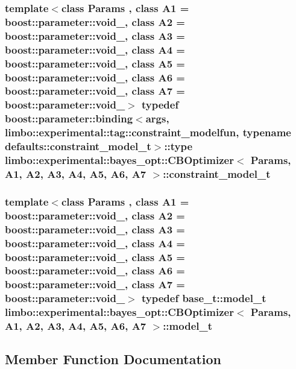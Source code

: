 \subsubsection[{constraint\+\_\+model\+\_\+t}]{\setlength{\rightskip}{0pt plus 5cm}template$<$class Params , class A1  = boost\+::parameter\+::void\+\_\+, class A2  = boost\+::parameter\+::void\+\_\+, class A3  = boost\+::parameter\+::void\+\_\+, class A4  = boost\+::parameter\+::void\+\_\+, class A5  = boost\+::parameter\+::void\+\_\+, class A6  = boost\+::parameter\+::void\+\_\+, class A7  = boost\+::parameter\+::void\+\_\+$>$ typedef boost\+::parameter\+::binding$<${\bf args}, limbo\+::experimental\+::tag\+::constraint\+\_\+modelfun, typename {\bf defaults\+::constraint\+\_\+model\+\_\+t}$>$\+::type {\bf limbo\+::experimental\+::bayes\+\_\+opt\+::\+C\+B\+Optimizer}$<$ Params, A1, A2, A3, A4, A5, A6, A7 $>$\+::{\bf constraint\+\_\+model\+\_\+t}}\label{classlimbo_1_1experimental_1_1bayes__opt_1_1_c_b_optimizer_a1f820a8eb0aebd5eb8ff359b35b98bdc}
\hypertarget{classlimbo_1_1experimental_1_1bayes__opt_1_1_c_b_optimizer_a2809982ff7ad024476d8a7babfec9166}{}
\subsubsection[{model\+\_\+t}]{\setlength{\rightskip}{0pt plus 5cm}template$<$class Params , class A1  = boost\+::parameter\+::void\+\_\+, class A2  = boost\+::parameter\+::void\+\_\+, class A3  = boost\+::parameter\+::void\+\_\+, class A4  = boost\+::parameter\+::void\+\_\+, class A5  = boost\+::parameter\+::void\+\_\+, class A6  = boost\+::parameter\+::void\+\_\+, class A7  = boost\+::parameter\+::void\+\_\+$>$ typedef {\bf base\+\_\+t\+::model\+\_\+t} {\bf limbo\+::experimental\+::bayes\+\_\+opt\+::\+C\+B\+Optimizer}$<$ Params, A1, A2, A3, A4, A5, A6, A7 $>$\+::{\bf model\+\_\+t}}\label{classlimbo_1_1experimental_1_1bayes__opt_1_1_c_b_optimizer_a2809982ff7ad024476d8a7babfec9166}


\subsection{Member Function Documentation}
\hypertarget{classlimbo_1_1experimental_1_1bayes__opt_1_1_c_b_optimizer_af7b2e8e92cf103d2e44ed1fa75eb8c8b}{}
